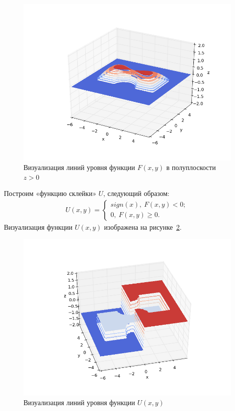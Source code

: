 \documentclass[12pt,a4paper,oneside]{extarticle}
\begin{document}
    \begin{figure}[ht!]
        \centering
        \includegraphics[scale=0.8]{figure_1.png}
        \caption{Визуализация линий уровня функции $F(x,y)$ в полуплоскости $z > 0$}
        \label{pic:f1}
    \end{figure}

    Построим «функцию склейки» $U$, следующий образом:
    \begin{gather}
        U(x,y) = 
        \begin{cases}
            sign(x),~ F(x,y) < 0; \nonumber \\
            0, ~ F(x,y) \ge 0.
        \end{cases}
    \end{gather}
    Визуализация функции $U(x,y)$ изображена на рисунке~\ref{pic:f2}.

    \begin{figure}[ht!]
        \centering
        \includegraphics[scale=0.8]{figure_2.png}
        \caption{Визуализация линий уровня функции $U(x,y)$}
        \label{pic:f2}
    \end{figure}
\end{document}
